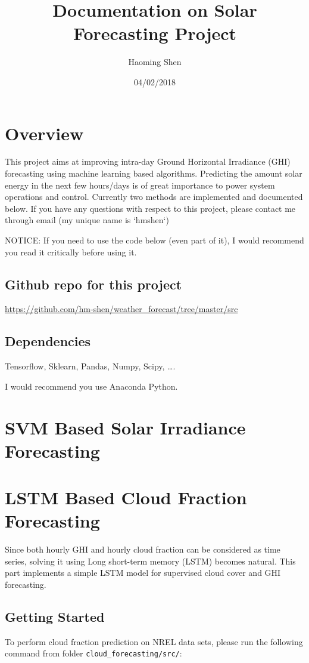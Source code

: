\documentclass[11pt]{article}
\author{Haoming Shen}
\date{04/02/2018}
\title{Documentation on Solar Forecasting Project}
\begin{document}
\maketitle
\tableofcontents

\clearpage

\section{Overview}
\label{sec-1}
This project aims at improving intra-day Ground Horizontal Irradiance
(GHI) forecasting using machine learning based algorithms. Predicting
the amount solar energy in the next few hours/days is of great
importance to power system operations and control. Currently two
methods are implemented and documented below. If you have any
questions with respect to this project, please contact me through
email (my unique name is `hmshen`)

NOTICE: If you need to use the code below (even part of it), I would
recommend you read it critically before using it.

\subsection{Github repo for this project}
\label{sec-1-1}
\url{https://github.com/hm-shen/weather_forecast/tree/master/src}

\subsection{Dependencies}
\label{sec-1-2}
Tensorflow, Sklearn, Pandas, Numpy, Scipy, \ldots{}.

I would recommend you use Anaconda Python.

\section{SVM Based Solar Irradiance Forecasting}
\label{sec-2}

\section{LSTM Based Cloud Fraction Forecasting}
\label{sec-3}
Since both hourly GHI and hourly cloud fraction can be considered as
time series, solving it using Long short-term memory (LSTM) becomes
natural. This part implements a simple LSTM model for supervised cloud
cover and GHI forecasting.

\subsection{Getting Started}
\label{sec-3-1}
To perform cloud fraction prediction on NREL data sets, please run the
following command from folder \texttt{cloud\_forecasting/src/}:
\end{document}
